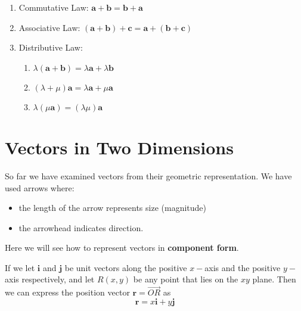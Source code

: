 \documentclass[11pt,a4paper]{book}
\begin{document}
\begin{enumerate}

\item Commutative Law: $\textbf{a}+\textbf{b}=\textbf{b}+\textbf{a}$

\item Associative Law: $\left(\textbf{a}+\textbf{b}\right)+\textbf{c}=\textbf{a}+\left(\textbf{b}+\textbf{c}\right)$

\item Distributive Law:

\begin{enumerate}[label=(\roman*)]

\item $\lambda\left(\textbf{a}+\textbf{b}\right)=\lambda\textbf{a}+\lambda\textbf{b}$

\item $\left(\lambda+\mu\right)\textbf{a}=\lambda\textbf{a}+\mu\textbf{a}$

\item $\lambda\left(\mu\textbf{a}\right)=\left(\lambda\mu\right)\textbf{a}$

\end{enumerate}

\end{enumerate}

\newpage{}

\section{Vectors in Two Dimensions}

So far we have examined vectors from their geometric representation.
We have used arrows where:
\begin{itemize}
\item the length of the arrow represents size (magnitude)
\item the arrowhead indicates direction.
\end{itemize}
Here we will see how to represent vectors in\textbf{ component form}.

If we let $\textbf{i}$ and $\textbf{j}$ be unit vectors along the
positive $x-$axis and the positive $y-$axis respectively, and let
$R\left(x,y\right)$ be any point that lies on the $xy$ plane. Then
we can express the position vector $\textbf{r}=\overrightarrow{OR}$
as
\[
\textbf{r}=x\textbf{i}+y\textbf{j}
\]
\end{document}
